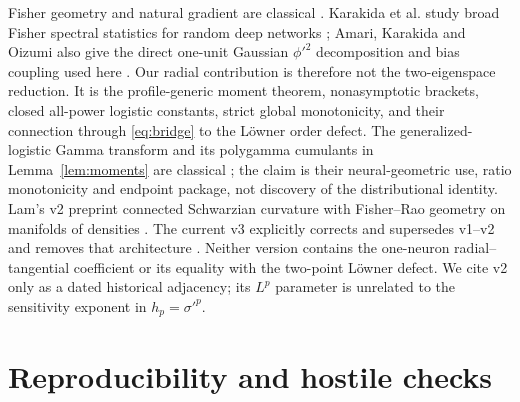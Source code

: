 \documentclass[11pt]{article}
\begin{document}
Fisher geometry and natural gradient are classical \cite{amari1998}.  Karakida et al. study broad Fisher spectral
statistics for random deep networks \cite{karakida2019}; Amari, Karakida and Oizumi also give the direct one-unit
Gaussian $\phi'^2$ decomposition and bias coupling used here \cite{amari2019}.  Our radial contribution is
therefore not the two-eigenspace reduction.  It is the profile-generic moment theorem, nonasymptotic brackets,
closed all-power logistic constants, strict global monotonicity, and their connection through \eqref{eq:bridge} to
the L\"owner order defect.  The generalized-logistic Gamma transform and its polygamma cumulants in
Lemma~\ref{lem:moments} are classical \cite{ojo2004,lee2025}; the claim is their neural-geometric use, ratio
monotonicity and endpoint package, not discovery of the distributional identity.
Lam's v2 preprint connected Schwarzian curvature with Fisher--Rao geometry on manifolds of densities
\cite{lam2026v2}.  The current v3 explicitly corrects and supersedes v1--v2 and removes that architecture
\cite{lam2026v3}.  Neither version contains the one-neuron radial--tangential coefficient or its equality with the
two-point L\"owner defect.  We cite v2 only as a dated historical adjacency; its $L^p$ parameter is unrelated to
the sensitivity exponent in $h_p=\sigma'^p$.

\section{Reproducibility and hostile checks}
\end{document}
